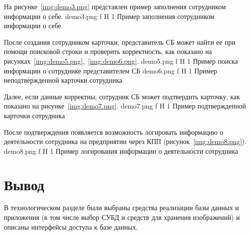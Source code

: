 На рисунке~\ref{img:demo3.png} представлен пример заполнения сотрудником информации о себе.
	{demo3.png}
	{f}
	{H}
	{1\textwidth}
	{Пример заполнения сотрудником информации о себе}
	
После создания сотрудником карточки, представитель СБ может найти ее при помощи поисковой строки и проверить корректность, как показано на рисунках~\ref{img:demo5.png},~\ref{img:demo6.png}.
	{demo5.png}
	{f}
	{H}
	{1\textwidth}
	{Пример поиска информации о сотруднике представителем СБ}
	{demo6.png}
	{f}
	{H}
	{1\textwidth}
	{Пример неподтвержденной карточки сотрудника}


Далее, если данные корректны, сотрудник СБ может подтвердить карточку, как показано на рисунке~\ref{img:demo7.png}.
	{demo7.png}
	{f}
	{H}
	{1\textwidth}
	{Пример подтвержденной карточки сотрудника}

После подтверждения появляется возможность логировать информацию о деятельности сотрудника на предприятии через КПП (рисунок~\ref{img:demo8.png}).
	{demo8.png}
	{f}
	{H}
	{1\textwidth}
	{Пример логирования информации о деятельности сотрудника}

\section*{Вывод}

В технологическом разделе были выбраны средства реализации базы данных и приложения (в том числе выбор СУБД и средств для хранения изображений) и описаны интерфейсы доступа к базе данных.